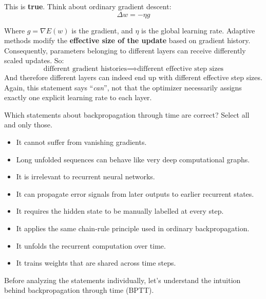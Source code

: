 \begin{itemize}
        This is \textbf{true}. Think about ordinary gradient descent:
        \begin{equation*}
            \Delta w = - \eta g
        \end{equation*}

        Where $g = \nabla E(w)$ is the gradient, and $\eta$ is the global learning rate. Adaptive methods modify the \textbf{effective size of the update} based on gradient history. Consequently, parameters belonging to different layers can receive differently scaled updates. So:
        \begin{equation*}
            \text{different gradient histories} \implies \text{different effective step sizes}
        \end{equation*}
        And therefore different layers can indeed end up with different effective step sizes. Again, this statement says ``\emph{can}'', not that the optimizer necessarily assigns exactly one explicit learning rate to each layer.
\end{itemize}

\newpage

\noindent
\exercise[1] Which statements about backpropagation through time are correct? Select all and only those.
\begin{itemize}
    \item It cannot suffer from vanishing gradients.
    \item Long unfolded sequences can behave like very deep computational graphs.
    \item It is irrelevant to recurrent neural networks.
    \item It can propagate error signals from later outputs to earlier recurrent states.
    \item It requires the hidden state to be manually labelled at every step.
    \item It applies the same chain-rule principle used in ordinary backpropagation.
    \item It unfolds the recurrent computation over time.
    \item It trains weights that are shared across time steps.
\end{itemize}
\solution Before analyzing the statements individually, let's understand the intuition behind backpropagation through time (BPTT).


